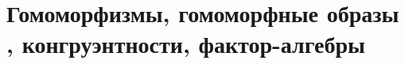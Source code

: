\documentclass[../main/document.tex]{subfiles}
\begin{document}
\section{Гомоморфизмы, гомоморфные образы , конгруэнтности, фактор-алгебры}
\end{document}

